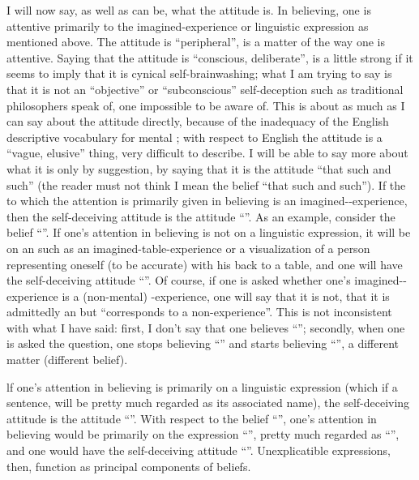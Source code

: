 I will now say, as well as can be, what the attitude is. In believing, one is attentive primarily to the imagined-experience or linguistic expression as mentioned above. The attitude is \enquote{peripheral}, is a matter of the way one is attentive. Saying that the attitude is \enquote{conscious, deliberate}, is a little strong if it seems to imply that it is cynical self-brainwashing; what I am trying to say is that it is not an \enquote{objective} or \enquote{subconscious} self-deception such as traditional philosophers speak of, one impossible to be aware of. This is about as much as I can say about the attitude directly, because of the inadequacy of the English descriptive vocabulary for mental ; with respect to English the attitude is a \enquote{vague, elusive} thing, very difficult to describe. I will be able to say more about what it is only by suggestion, by saying that it is the attitude \enquote{that such and such} (the reader must not think I mean the belief \enquote{that such and such}). If the  to which the attention is primarily given in believing is an imagined-\x-experience, then the self-deceiving attitude is the attitude \enquote{}. As an example, consider the belief \enquote{}. If one's attention in believing is not on a linguistic expression, it will be on an  such as an imagined-table-experience or a visualization of a person representing oneself (to be accurate) with his back to a table, and one will have the self-deceiving attitude \enquote{}. Of course, if one is asked whether one's imagined-\x-experience is a (non-mental) \x-experience, one will say that it is not, that it is admittedly an  but \enquote{corresponds to a non-experience}. This is not inconsistent with what I have said: first, I don't say that one believes \enquote{}; secondly, when one is asked the question, one stops believing \enquote{} and starts believing \enquote{}, a different matter (different belief). 

lf one's attention in believing is primarily on a linguistic expression (which if a sentence, will be pretty much regarded as its associated name), the self-deceiving attitude is the attitude \enquote{}. With respect to the belief \enquote{}, one's attention in believing would be primarily on the expression \enquote{}, pretty much regarded as \enquote{}, and one would have the self-deceiving attitude \enquote{}. Unexplicatible expressions, then, function as principal components of beliefs. 

